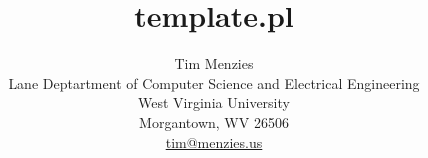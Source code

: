     \usepackage{times}
    \setcounter{tocdepth}{2}
    \title{template.pl}
\usepackage{url}
\author{
Tim Menzies\\
Lane Deptartment of Computer Science and Electrical Engineering\\
West Virginia University\\
Morgantown, WV 26506\\
{\small \url{tim@menzies.us}}}
    \date{}
    
     \maketitle
    \small
